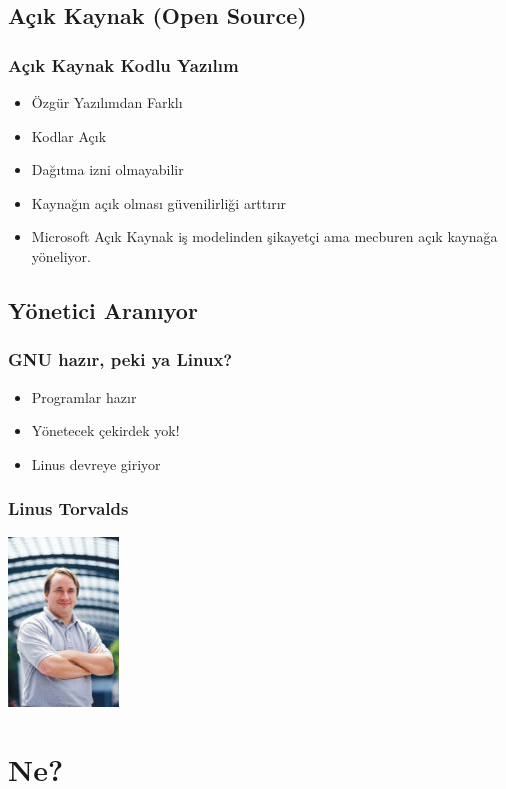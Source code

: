 \documentclass{beamer}
\begin{document}
	\subsection{Açık Kaynak (Open Source)}
		\begin{frame}
		 	\frametitle{Açık Kaynak Kodlu Yazılım}
			\begin{itemize}
			 \item Özgür Yazılımdan Farklı
			 \item Kodlar Açık
			 \item Dağıtma izni olmayabilir
			 \item Kaynağın açık olması güvenilirliği arttırır
			 \item Microsoft Açık Kaynak iş modelinden şikayetçi ama mecburen açık kaynağa yöneliyor.
			\end{itemize}
		\end{frame}
	\subsection{Yönetici Aranıyor}
		\begin{frame}
		 	\frametitle{GNU hazır, peki ya Linux?}
				\begin{itemize}
				\item Programlar hazır
				\item Yönetecek çekirdek yok!
				\item Linus devreye giriyor
				\end{itemize}
		\end{frame}
		\begin{frame}
		 	\frametitle{Linus Torvalds}
				\begin{center}
					\includegraphics{linus.jpg}
				\end{center}
		\end{frame}
		



\section{Ne?}
\end{document}

